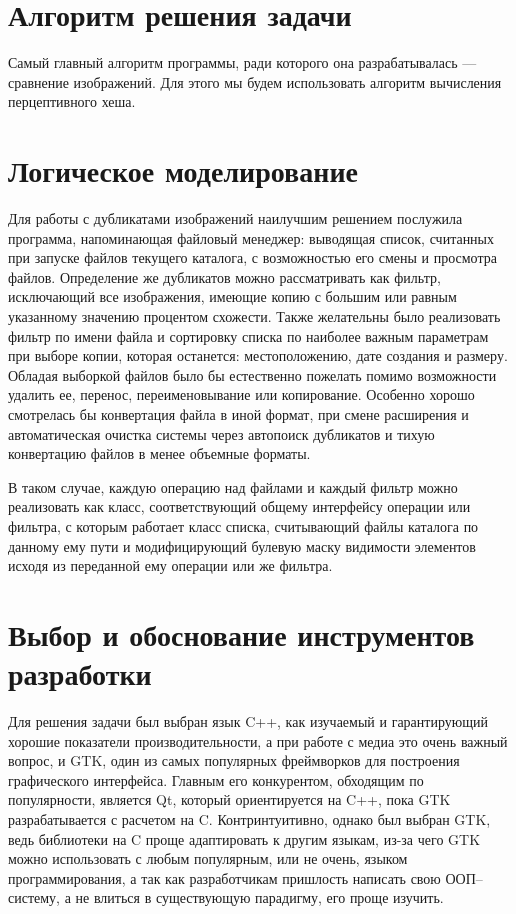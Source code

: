 \documentclass[variant=courcework]{bsuir}
\begin{document}
\section{Алгоритм решения задачи}

Самый главный алгоритм программы, ради которого она разрабатывалась ---
сравнение изображений. Для этого мы будем использовать
алгоритм вычисления перцептивного хеша. 


\section{Логическое моделирование}

Для работы с дубликатами изображений наилучшим решением послужила программа,
напоминающая файловый менеджер: выводящая список, считанных при запуске файлов
текущего каталога, с возможностью его смены и просмотра файлов. Определение же
дубликатов можно рассматривать как фильтр, исключающий все изображения, имеющие
копию с большим или равным указанному значению процентом схожести. Также
желательны было реализовать фильтр по имени файла и сортировку списка по
наиболее важным параметрам при выборе копии, которая останется: местоположению,
дате создания и размеру. Обладая выборкой файлов было бы естественно пожелать
помимо возможности удалить ее, перенос, переименовывание или копирование.
Особенно хорошо смотрелась бы конвертация файла в иной формат, при смене
расширения и автоматическая очистка системы через автопоиск дубликатов и тихую
конвертацию файлов в менее объемные форматы.

В таком случае, каждую операцию над файлами и каждый фильтр можно реализовать
как класс, соответствующий общему интерфейсу операции или фильтра, с которым
работает класс списка, считывающий файлы каталога по данному ему пути и
модифицирующий булевую маску видимости элементов исходя из переданной ему
операции или же фильтра.


\section{Выбор и обоснование инструментов разработки}

Для решения задачи был выбран язык C++, как изучаемый и гарантирующий хорошие
показатели производительности, а при работе с медиа это очень важный вопрос, и
GTK, один из самых популярных фреймворков для построения графического
интерфейса. Главным его конкурентом, обходящим по популярности, является Qt,
который ориентируется на C++, пока GTK разрабатывается с расчетом на C.
Контринтуитивно, однако был выбран GTK, ведь библиотеки на C проще адаптировать
к другим языкам, из-за чего GTK можно использовать с любым популярным, или не
очень, языком программирования, а так как разработчикам пришлость написать свою
ООП--систему, а не влиться в существующую парадигму, его проще изучить.
\end{document}
